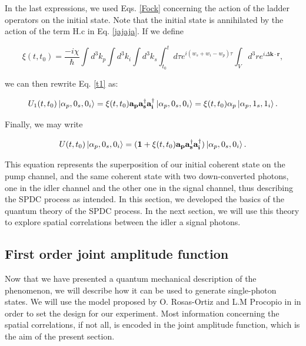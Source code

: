 \documentclass[12pt]{book}
\begin{document}
In the last expressions, we used Eqs. \ref{Fock}  concerning the action of the ladder operators on the initial state. Note that the initial state is annihilated by the action of the term $\mathrm{H.c}$ in Eq. \ref{jajaja}.  If we define 

\begin{equation}
 \xi(t,t_{0})=\frac{-i\chi}{\hbar}  \int d^{3}k_{p}\int d^{3}k_{i} \int d^{3}k_{s}    \int_{t_{0}}^{t} d\tau e^{i(w_{s}+w_{i}-w_{p})\tau}  
\int_{V} d^{3}r  e^{i \Delta\textbf{k} \cdot\textbf{r}} ,
\end{equation}



we can then rewrite Eq. \ref{t1} as:

\begin{equation}
U_{1}(t,t_{0})\ket{\alpha_{p},0_{s},0_{i}}=\xi(t,t_{0}) \mathbf{a_{p}}\mathbf{a_{s}^{\dagger}}\mathbf{a_{i}^{\dagger}}\ket{\alpha_{p},0_{s},0_{i}}=\xi(t,t_{0}) \alpha_{p} \ket{\alpha_{p},1_{s},1_{i}}.
\end{equation}

Finally, we may write

\begin{equation}
    U(t,t_{0})\ket{\alpha_{p},0_{s},0_{i}}=(\mathbf{1}+\xi(t,t_{0}) \mathbf{a_{p}}\mathbf{a_{s}^{\dagger}}\mathbf{a_{i}^{\dagger}})\ket{\alpha_{p},0_{s},0_{i}}. \label{evo}
\end{equation}

This equation represents the superposition of our initial coherent state on the pump channel, and the same coherent state with two down-converted photons, one in the idler channel and the other one in the signal channel, thus describing the SPDC process as intended. In this section, we developed the basics of the quantum theory of the SPDC process. In the next section, we will use this theory to explore spatial correlations between the idler a signal photons.

\subsection{First order joint amplitude function}

Now that we have presented a quantum mechanical description of the phenomenon, we will describe how it can be used to generate single-photon states. We will use the model proposed by O. Rosas-Ortiz and L.M Procopio in \cite{procopio} in order to set the design for our experiment. Most information concerning the spatial correlations, if not all, is encoded in the joint amplitude function, which is the aim of the present section. 
\end{document}

